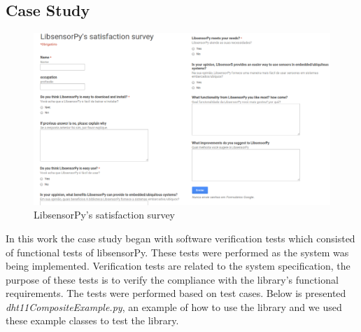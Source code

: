 \documentclass{acm_proc_article-sp}
\begin{document}
\subsection{Case Study}
\begin{figure}[t]
    \centering
    	\includegraphics[width=1.0\textwidth]{pictures/survey2.png}
    		\caption{LibsensorPy's satisfaction survey}  
    		\label{fig:survey}  	
\end{figure}
In this work the case study began with software verification tests which consisted of functional tests of libsensorPy. These tests were performed as the system was being implemented.
\newline
\newline
Verification tests are related to the system specification, the purpose of these tests is to verify the compliance with the library's functional requirements. The tests were performed based on test cases.
\newline
\newline
Below is presented \textit{dht11CompositeExample.py}, an example of how to use the library and we used these example classes to test the library.
\end{document}
